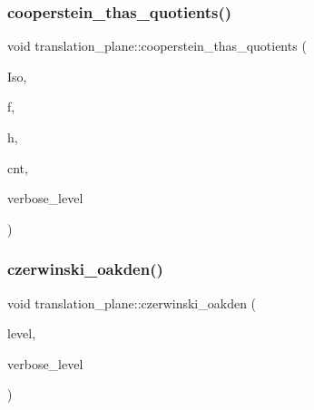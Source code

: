 \subsubsection{\texorpdfstring{cooperstein\+\_\+thas\+\_\+quotients()}{cooperstein\_thas\_quotients()}}
{\footnotesize\ttfamily void translation\+\_\+plane\+::cooperstein\+\_\+thas\+\_\+quotients (\begin{DoxyParamCaption}\item[{\mbox{\hyperlink{classisomorph}{isomorph}} \&}]{Iso,  }\item[{ofstream \&}]{f,  }\item[{\mbox{\hyperlink{galois_8h_a09fddde158a3a20bd2dcadb609de11dc}{I\+NT}}}]{h,  }\item[{\mbox{\hyperlink{galois_8h_a09fddde158a3a20bd2dcadb609de11dc}{I\+NT}} \&}]{cnt,  }\item[{\mbox{\hyperlink{galois_8h_a09fddde158a3a20bd2dcadb609de11dc}{I\+NT}}}]{verbose\+\_\+level }\end{DoxyParamCaption})}

\mbox{\label{classtranslation__plane_a356e35b65a5433524692ecfc99843b6e}} 
\subsubsection{\texorpdfstring{czerwinski\+\_\+oakden()}{czerwinski\_oakden()}}
{\footnotesize\ttfamily void translation\+\_\+plane\+::czerwinski\+\_\+oakden (\begin{DoxyParamCaption}\item[{\mbox{\hyperlink{galois_8h_a09fddde158a3a20bd2dcadb609de11dc}{I\+NT}}}]{level,  }\item[{\mbox{\hyperlink{galois_8h_a09fddde158a3a20bd2dcadb609de11dc}{I\+NT}}}]{verbose\+\_\+level }\end{DoxyParamCaption})}

\mbox{\label{classtranslation__plane_a6ba0fa3983a46c7c545ad103575be443}} 
